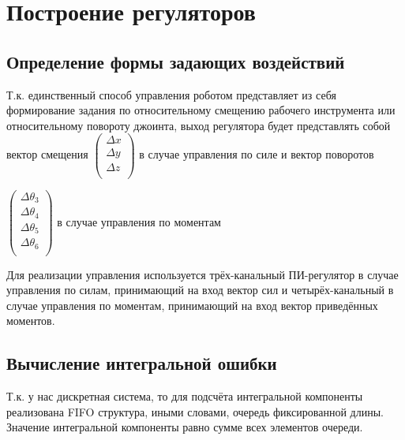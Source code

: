 \documentclass[a4paper,14pt,russian]{extreport} \usepackage{extsizes}
\begin{document}
	\section{Построение регуляторов}
	\subsection{Определение формы задающих воздействий}
	Т.к. единственный способ управления роботом представляет из себя формирование задания по относительному смещению рабочего инструмента или относительному повороту джоинта, выход регулятора будет представлять собой вектор смещения $\begin{pmatrix}
	\Delta x \\ \Delta y \\ \Delta z \\
	\end{pmatrix} $ в случае управления по силе и вектор поворотов
	 
	$\begin{pmatrix}
	\Delta \theta_{3}\\ \Delta \theta_{4} \\ \Delta \theta_{5} \\ \Delta \theta_{6} \\ \end{pmatrix} $ в случае управления по моментам
	
	Для реализации управления используется трёх-канальный ПИ-регулятор в случае управления по силам, принимающий на вход вектор сил и четырёх-канальный в случае управления по моментам, принимающий на вход вектор приведённых моментов.
	\subsection{Вычисление интегральной ошибки}
	Т.к. у нас дискретная система, то для подсчёта интегральной компоненты реализована FIFO структура, иными словами, очередь фиксированной длины. Значение интегральной компоненты равно сумме всех элементов очереди.
	
	
\end{document}

